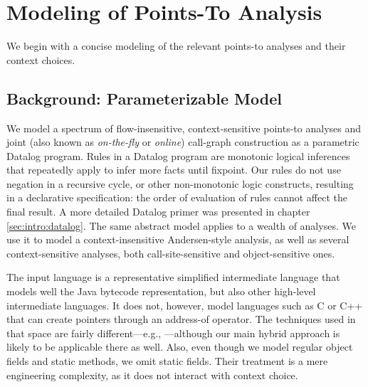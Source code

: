 
\section{Modeling of Points-To Analysis}
\label{sec:hybrid:model}

We begin with a concise modeling of the relevant points-to analyses and their context choices.

\subsection{Background: Parameterizable Model}

We model a spectrum of flow-insensitive, context-sensitive points-to analyses and joint (also known as \emph{on-the-fly} or \emph{online}) call-graph construction as a parametric Datalog program. Rules in a Datalog program are monotonic logical inferences that repeatedly apply to infer more facts until fixpoint. Our rules do not use negation in a recursive cycle, or other non-monotonic logic constructs, resulting in a declarative specification: the order of evaluation of rules cannot affect the final result. A more detailed Datalog primer was presented in chapter \ref{sec:intro:datalog}. The same abstract model applies to a wealth of analyses. We use it to model a context-insensitive Andersen-style \cite{thesis:Andersen} analysis, as well as several context-sensitive analyses, both call-site-sensitive and object-sensitive ones.

The input language is a representative simplified intermediate language that models well the Java bytecode representation, but also other high-level intermediate languages. It does not, however, model languages such as C or C++ that can create pointers through an address-of operator. The techniques used in that space are fairly different---e.g., \cite{pldi:2007:Hardekopf,popl:2009:Hardekopf}---although our main hybrid approach is likely to be applicable there as well. Also, even though we model regular object fields and static methods, we omit static fields. Their treatment is a mere engineering complexity, as it does not interact with context choice.

